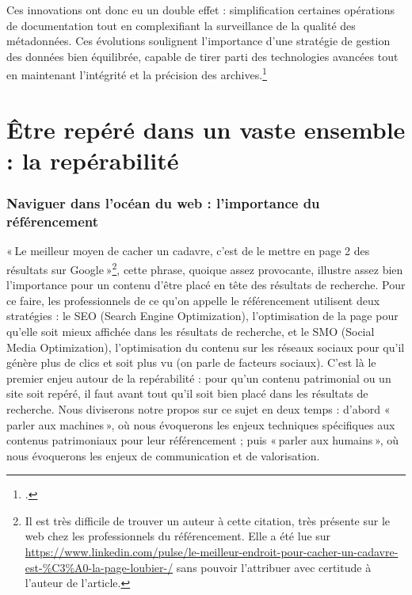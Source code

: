 Ces innovations ont donc eu un double effet : simplification certaines opérations de documentation tout en complexifiant la surveillance de la qualité des métadonnées. Ces évolutions soulignent l'importance d'une stratégie de gestion des données bien équilibrée, capable de tirer parti des technologies avancées tout en maintenant l'intégrité et la précision des archives.\footcite{sonderegger2024}



\chapter{Être repéré dans un vaste ensemble : la repérabilité}

\subsection{Naviguer dans l'océan du web : l'importance du référencement}

« Le meilleur moyen de cacher un cadavre, c’est de le mettre en page 2 des résultats sur Google »\footnote{Il est très difficile de trouver un auteur à cette citation, très présente sur le web chez les professionnels du référencement. Elle a été lue sur \url{https://www.linkedin.com/pulse/le-meilleur-endroit-pour-cacher-un-cadavre-est-\%C3\%A0-la-page-loubier-/} sans pouvoir l’attribuer avec certitude à l’auteur de l’article.}, cette phrase, quoique assez provocante, illustre assez bien l’importance pour un contenu d’être placé en tête des résultats de recherche. Pour ce faire, les professionnels de ce qu’on appelle le référencement utilisent deux stratégies : le SEO (Search Engine Optimization), l'optimisation de la page pour qu’elle soit mieux affichée dans les résultats de recherche, et le SMO (Social Media Optimization), l'optimisation du contenu sur les réseaux sociaux pour qu’il génère plus de clics et soit plus vu (on parle de facteurs sociaux). C’est là le premier enjeu autour de la repérabilité : pour qu’un contenu patrimonial ou un site soit repéré, il faut avant tout qu’il soit bien placé dans les résultats de recherche. Nous diviserons notre propos sur ce sujet en deux temps : d’abord « parler aux machines », où nous évoquerons les enjeux techniques spécifiques aux contenus patrimoniaux pour leur référencement ; puis « parler aux humains », où nous évoquerons les enjeux de communication et de valorisation. 

